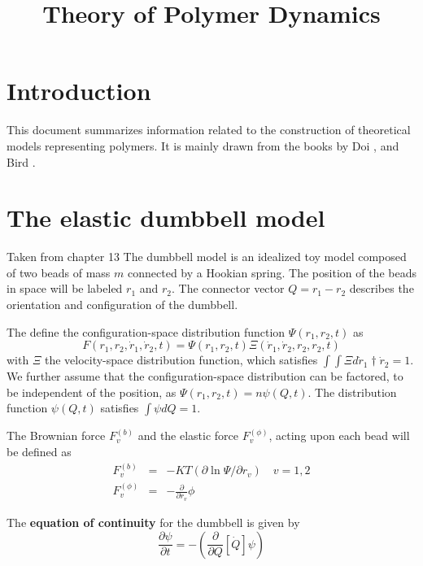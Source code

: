 \documentclass{report}
\begin{document}
\title{Theory of Polymer Dynamics}
\maketitle
\section{Introduction}
This document summarizes information related to the construction of theoretical models representing polymers. 
It is mainly drawn from the books by Doi \cite{doi1986theory}\cite{doi1996introduction}, and Bird \cite{bird1987dynamics}. 

\section{The elastic dumbbell model}
Taken from \cite{bird1987dynamics} chapter 13 The dumbbell model is an idealized toy model composed of two beads of mass $m$ connected by a Hookian spring. The position of the beads in space will be labeled $r_1$ and $r_2$.  The connector vector $Q=r_1-r_2$ describes the orientation and configuration of the dumbbell. 

The define the configuration-space distribution function $\Psi(r_1,r_2,t)$ as 
\begin{equation*}
F(r_1,r_2,\dot{r}_1,\dot{r}_2,t)=\Psi(r_1,r_2,t)\varXi(\dot{r}_1,\dot{r}_2,r_2,r_2,t)
\end{equation*}
 with $\varXi$ the velocity-space distribution function, which satisfies $\int\int\varXi d\dot{r}_1\dagger\dot{r}_2=1$. We further assume that the configuration-space distribution can be factored, to be independent of the position, as $\Psi(r_1,r_2,t)=n\psi(Q,t)$. The distribution function $\psi(Q,t)$ satisfies $\int\psi dQ=1$.
 
 The Brownian force $F_v^{(b)}$ and the elastic force $F_v^{(\phi)}$, acting upon each bead will be defined as 
 \begin{eqnarray*}
 F_v^{(b)} &=& -KT(\partial \ln \Psi/\partial r_v) \quad v=1,2\\
 F_v^{(\phi)} &=& -\frac{\partial}{\partial r_v}\phi
 \end{eqnarray*}
 
 The \textbf{equation of continuity} for the dumbbell is given by 
 \begin{equation*}
 \frac{\partial \psi}{\partial t}=-\left(\frac{\partial}{\partial Q}[\dot{Q}]\psi \right)
 \end{equation*}
\end{document}
